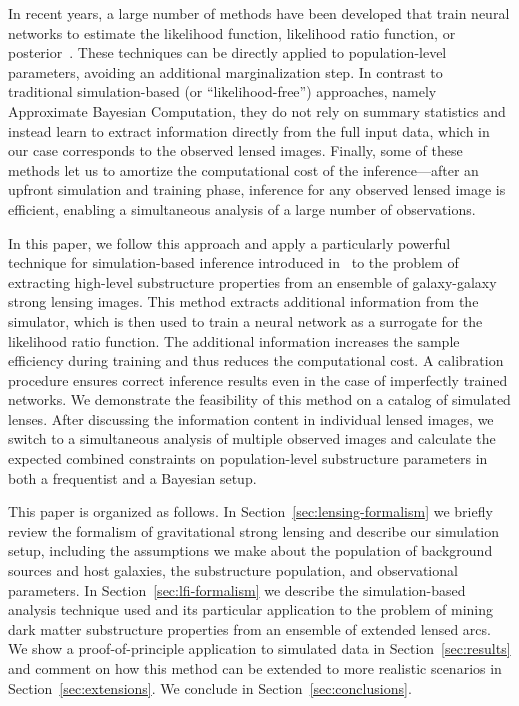 \documentclass[twocolumn]{aastex63}
\begin{document}
In recent years, a large number of methods have been developed that train neural networks to estimate the likelihood function, likelihood ratio function, or posterior~\citep{2012arXiv1212.1479F, 2014arXiv1410.8516D, 2015arXiv150203509G, 2015arXiv150505770J, Cranmer:2015bka,  2016arXiv160508803D, 2016arXiv160206701P, NIPS2016_6084, 2016arXiv161110242D, 2016arXiv160502226U,  2016arXiv160605328V, 2016arXiv160903499V, 2016arXiv160106759V, 2017arXiv170208896T, 2017arXiv170507057P, 2017arXiv170707113L, 2017arXiv171101861L, gutmann2017likelihood, DBLP:journals/corr/abs-1806-07366, 2018arXiv181009899D, 2018arXiv181001367G, 2018arXiv180400779H, 2018arXiv180703039K, 2018arXiv180509294L, 2018arXiv180507226P, Alsing:2019xrx, Hermans:2019ioj}. These techniques can be directly applied to population-level parameters, avoiding an additional marginalization step. In contrast to traditional simulation-based (or ``likelihood-free'') approaches, namely Approximate Bayesian Computation, they do not rely on summary statistics and instead learn to extract information directly from the full input data, which in our case corresponds to the observed lensed images. Finally, some of these methods let us to amortize the computational cost of the inference---after an upfront simulation and training phase, inference for any observed lensed image is efficient, enabling a simultaneous analysis of a large number of observations.

In this paper, we follow this approach and apply a particularly powerful technique for simulation-based inference introduced in~\citet{1805.00013, 1805.00020, 1805.12244, Stoye:2018ovl} to the problem of extracting high-level substructure properties from an ensemble of galaxy-galaxy strong lensing images. This method extracts additional information from the simulator, which is then used to train a neural network as a surrogate for the likelihood ratio function. The additional information increases the sample efficiency during training and thus reduces the computational cost. A calibration procedure ensures correct inference results even in the case of imperfectly trained networks. We demonstrate the feasibility of this method on a catalog of simulated lenses. After discussing the information content in individual lensed images, we switch to a simultaneous analysis of multiple observed images and calculate the expected combined constraints on population-level substructure parameters in both a frequentist and a Bayesian setup.

This paper is organized as follows. In Section~\ref{sec:lensing-formalism} we briefly review the formalism of gravitational strong lensing and describe our simulation setup, including the assumptions we make about the population of background sources and host galaxies, the substructure population, and observational parameters. In Section~\ref{sec:lfi-formalism} we describe the simulation-based analysis technique used and its particular application to the problem of mining dark matter substructure properties from an ensemble of extended lensed arcs. We show a proof-of-principle application to simulated data in Section~\ref{sec:results} and comment on how this method can be extended to more realistic scenarios in Section~\ref{sec:extensions}. We conclude in Section~\ref{sec:conclusions}.
\end{document}
